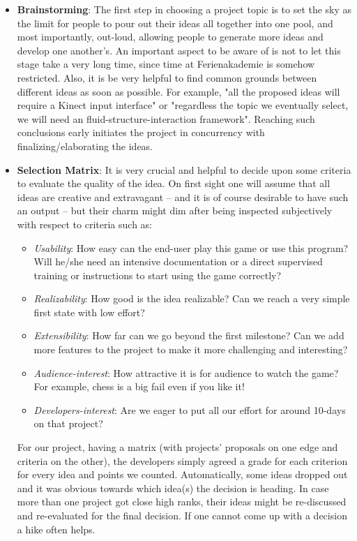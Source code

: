 \begin{itemize}
  \item \textbf{Brainstorming}: The first step in choosing a project topic is to set the sky as the limit for people to pour out their ideas all together into one pool, and most importantly, out-loud, allowing people to generate more ideas and develop one another's. An important aspect to be aware of is not to let this stage take a very long time, since time at Ferienakademie is somehow restricted. Also, it is be very helpful to find common grounds between different ideas as soon as possible. For example, "all the proposed ideas will require a Kinect input interface" or "regardless the topic we eventually select, we will need an fluid-structure-interaction framework". Reaching such conclusions early initiates the project in concurrency with finalizing/elaborating the ideas.
  
  \item \textbf{Selection Matrix}: It is very crucial and helpful to decide upon some criteria to evaluate the quality of the idea. On first sight one will assume that all ideas are creative and extravagant -- and it is of course desirable to have such an output -- but their charm might dim after being inspected subjectively with respect to criteria such as:
  \begin{itemize}
    \item \textit{Usability}: How easy can the end-user play this game or use this program? Will he/she need an intensive documentation or a direct supervised training or instructions to start using the game correctly?
    \item \textit{Realizability}: How good is the idea realizable? Can we reach a very simple first state with low effort?
    \item \textit{Extensibility}: How far can we go beyond the first milestone? Can we add more features to the project to make it more challenging and interesting?
    \item \textit{Audience-interest}: How attractive it is for audience to watch the game? For example, chess is a big fail even if you like it!
    \item \textit{Developers-interest}: Are we eager to put all our effort for around 10-days on that project?

  \end{itemize}
For our project, having a matrix (with projects' proposals on one edge and criteria on the other), the developers simply agreed a grade for each criterion for every idea and points we counted.
Automatically, some ideas dropped out and it was obvious towards which idea(s) the decision is heading. In case more than one project got close high ranks, their ideas might be re-discussed and re-evaluated for the final decision. If one cannot come up with a decision a hike often helps.
\end{itemize}


